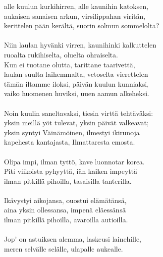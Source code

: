 alle kuulun kurkihirren, alle kaunihin katoksen,            \\
aukaisen sanaisen arkun, virsilippahan viritän,             \\
kerittelen pään kerältä, suorin solmun sommelolta?          \\
                                                            \\
Niin laulan hyvänki virren, kaunihinki kalkuttelen          \\
ruoalta rukihiselta, oluelta ohraiselta.                    \\
Kun ei tuotane olutta, tarittane taarivettä,                \\
laulan suulta laihemmalta, vetoselta vierettelen            \\
tämän iltamme iloksi, päivän kuulun kunniaksi,              \\
vaiko huomenen huviksi, uuen aamun alkeheksi.               \\
                                                            \\
Noin kuulin saneltavaksi, tiesin virttä tehtäväksi:         \\
yksin meillä yöt tulevat, yksin päivät valkeavat;           \\
yksin syntyi Väinämöinen, ilmestyi ikirunoja                \\
kapehesta kantajasta, Ilmattaresta emosta.                  \\
                                                            \\
Olipa impi, ilman tyttö, kave luonnotar korea.              \\
Piti viikoista pyhyyttä, iän kaiken impeyttä                \\
ilman pitkillä pihoilla, tasaisilla tanterilla.             \\
                                                            \\
Ikävystyi aikojansa, ouostui elämätänsä,                    \\
aina yksin ollessansa, impenä eläessänsä                    \\
ilman pitkillä pihoilla, avaroilla autioilla.               \\
                                                            \\
Jop' on astuiksen alemma, laskeusi lainehille,              \\
meren selvälle selälle, ulapalle aukealle.                  \\
